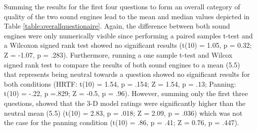 \documentclass[journal]{IEEEtran}
\begin{document}
\begin{table}[h]
\caption{Questionnaire results}
\label{table:questionnairetable}
\end{table}

Summing the results for the first four questions to form an overall category of quality of the two sound engines lead to the mean and median values depicted in Table \ref{table:overallquestionaire}. Again, the difference between both sound engines were only numerically visible since performing a paired samples t-test and a Wilcoxon signed rank test showed no significant results (t(10) = 1.05, p = 0.32; Z = -1.07, p = .283). Furthermore, running a one sample t-test and Wilcox signed rank test to compare the results of both sound engines to a mean (5.5) that represents being neutral towards a question showed no significant results for both conditions (HRTF: t(10) = 1.54, p = .154; Z = 1.54, p = .13; Panning: t(10) = -.22, p =.829; Z = -0.5, p = .96). However, summing only the first three questions, showed that the 3-D model ratings were significantly higher than the neutral mean (5.5) (t(10) = 2.83, p = .018; Z = 2.09, p = .036) which was not the case for the panning condition (t(10) = .86, p = .41; Z = 0.76, p = .447).

\end{document}
